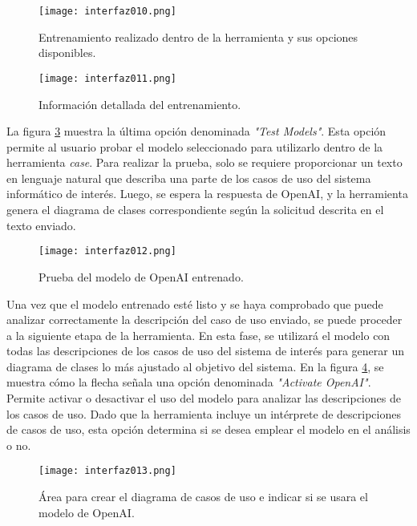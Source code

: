 \begin{figure}[H]  
	\centering
	\texttt{[image: interfaz010.png]} 
	\caption{Entrenamiento realizado dentro de la herramienta y sus opciones disponibles.}
	\label{fig:cap3_interfaz_010}
\end{figure} 

\begin{figure}[H]  
	\centering
	\texttt{[image: interfaz011.png]} 
	\caption{Información detallada del entrenamiento.}
	\label{fig:cap3_interfaz_011}
\end{figure}

La figura \ref{fig:cap3_interfaz_012} muestra la última opción denominada \textit{"Test Models"}. Esta opción permite al usuario probar el modelo seleccionado para utilizarlo dentro de la herramienta \textit{case}. Para realizar la prueba, solo se requiere proporcionar un texto en lenguaje natural que describa una parte de los casos de uso del sistema informático de interés. Luego, se espera la respuesta de OpenAI, y la herramienta genera el diagrama de clases correspondiente según la solicitud descrita en el texto enviado.
 
 \begin{figure}[H]  
 	\centering
 	\texttt{[image: interfaz012.png]} 
 	\caption{Prueba del modelo de OpenAI entrenado.}
 	\label{fig:cap3_interfaz_012}
 \end{figure}

Una vez que el modelo entrenado esté listo y se haya comprobado que puede analizar correctamente la descripción del caso de uso enviado, se puede proceder a la siguiente etapa de la herramienta. En esta fase, se utilizará el modelo con todas las descripciones de los casos de uso del sistema de interés para generar un diagrama de clases lo más ajustado al objetivo del sistema. En la figura \ref{fig:cap3_interfaz_013}, se muestra cómo la flecha señala una opción denominada \textit{"Activate OpenAI"}. Permite activar o desactivar el uso del modelo para analizar las descripciones de los casos de uso. Dado que la herramienta incluye un intérprete de descripciones de casos de uso, esta opción determina si se desea emplear el modelo en el análisis o no.


 \begin{figure}[H]  
	\centering
	\texttt{[image: interfaz013.png]} 
	\caption{Área para crear el diagrama de casos de uso e indicar si se usara el modelo de OpenAI.}
	\label{fig:cap3_interfaz_013}
\end{figure}

